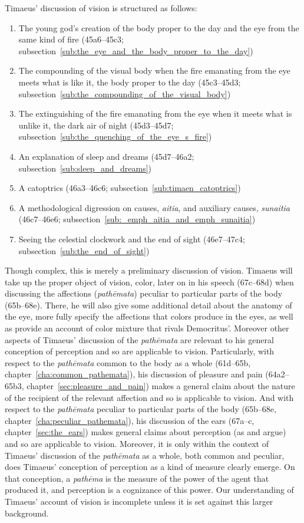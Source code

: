 Timaeus' discussion of vision is structured as follows:
\begin{enumerate}
	\item The young god's creation of the body proper to the day and the eye from the same kind of fire (45a6--45c3; subsection~\ref{sub:the_eye_and_the_body_proper_to_the_day})
	\item The compounding of the visual body when the fire emanating from the eye meets what is like it, the body proper to the day (45c3--45d3; subsection~\ref{sub:the_compounding_of_the_visual_body})
	\item The extinguishing of the fire emanating from the eye when it meets what is unlike it, the dark air of night (45d3--45d7; subsection~\ref{sub:the_quenching_of_the_eye_s_fire})
	\item An explanation of sleep and dreams (45d7--46a2; subsection~\ref{sub:sleep_and_dreams})
	\item A catoptrics (46a3--46c6; subsection~\ref{sub:timaen_catoptrics})
	\item A methodological digression on causes, \emph{aitia}, and auxiliary causes, \emph{sunaitia} (46c7--46e6; subsection~\ref{sub:_emph_aitia_and_emph_sunaitia})
	\item Seeing the celestial clockwork and the end of sight (46e7--47c4; subsection~\ref{sub:the_end_of_sight})
\end{enumerate}
Though complex, this is merely a preliminary discussion of vision. Timaeus will take up the proper object of vision, color, later on in his speech (67c–68d) when discussing the affections (\emph{pathēmata}) peculiar to particular parts of the body (65b–68e). There, he will also give some additional detail about the anatomy of the eye, more fully specify the affections that colors produce in the eyes, as well as provide an account of color mixture that rivals Democritus'. Moreover other aspects of Timaeus' discussion of the \emph{pathēmata} are relevant to his general conception of perception and so are applicable to vision. Particularly, with respect to the \emph{pathēmata} common to the body as a whole (61d–65b, chapter~\ref{cha:common_pathemata}), his discussion of pleasure and pain (64a2–65b3, chapter~\ref{sec:pleasure_and_pain}) makes a general claim about the nature of the recipient of the relevant affection and so is applicable to vision. And with respect to the \emph{pathēmata} peculiar to particular parts of the body (65b–68e, chapter~\ref{cha:peculiar_pathemata}), his discussion of the ears (67a–c, chapter~\ref{sec:the_ears}) makes general claims about perception (as \citealt{Barker:2000dy} and \citealt{Lautner:2005aa} argue) and so are applicable to vision. Moreover, it is only within the context of Timaeus' discussion of the \emph{pathēmata} as a whole, both common and peculiar, does Timaeus' conception of perception as a kind of measure clearly emerge. On that conception, a \emph{pathēma} is the measure of the power of the agent that produced it, and perception is a cognizance of this power. Our understanding of Timaeus' account of vision is incomplete unless it is set against this larger background.


